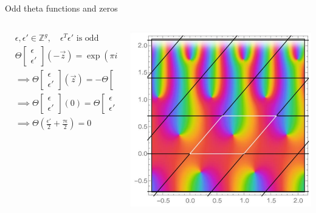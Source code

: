 \documentclass[11pt,aspectratio=169]{beamer}
\begin{document}
\begin{frame}{Odd theta functions and zeros}
    \begin{columns}[onlytextwidth]
        \begin{column}{0.55\textwidth}
            \begin{align*}
                & \epsilon,\epsilon' \in \mathbb Z^g , \quad \epsilon^T \epsilon'\text{ is odd} \\
                & \Theta\begin{bmatrix}\epsilon \\ \epsilon'\end{bmatrix}(-\vec z) = \exp(\pi i \epsilon^T \epsilon') \Theta\begin{bmatrix}\epsilon \\ \epsilon'\end{bmatrix}(\vec z)
                \\
                & \implies \Theta\begin{bmatrix}\epsilon \\ \epsilon'\end{bmatrix}(\vec z) = -\Theta\begin{bmatrix}\epsilon \\ \epsilon'\end{bmatrix}(-\vec z)
                \\
                & \implies \Theta\begin{bmatrix}\epsilon \\ \epsilon'\end{bmatrix}(0) = \Theta\begin{bmatrix}\epsilon \\ \epsilon'\end{bmatrix}(\vec \alpha + \tau \vec \beta) = 0
                \\
                & \implies \Theta\left(\frac{\epsilon'}{2}+\frac{\tau\epsilon}{2}\right) = 0
            \end{align*}
        \end{column}
        \begin{column}{0.45\textwidth}
            \center{}
            \includegraphics[width=0.7\columnwidth]{assets/genus1theta.png}


\end{column}
\end{columns}
\end{frame}
\end{document}
